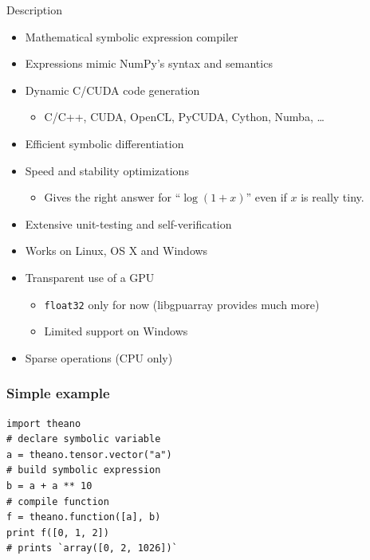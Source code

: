 \documentclass[utf8x,xcolor=pdftex,dvipsnames,table]{beamer}
\begin{document}
\begin{frame}{Description}
  \begin{itemize}
    \item Mathematical symbolic expression compiler
    \item Expressions mimic NumPy's syntax and semantics
    \item Dynamic C/CUDA code generation
    \begin{itemize}
      \item C/C++, CUDA, OpenCL, PyCUDA, Cython, Numba, \ldots
    \end{itemize}
    \item Efficient symbolic differentiation
    \item Speed and stability optimizations
    \begin{itemize}
      \item Gives the right answer for ``$\log (1 + x)$'' even if $x$ is really tiny.
    \end{itemize}
    \item Extensive unit-testing and self-verification
    \item Works on Linux, OS X and Windows
    \item Transparent use of a GPU
    \begin{itemize}
      \item {\tt float32} only for now (libgpuarray provides much more)
      \item Limited support on Windows
    \end{itemize}

    \item Sparse operations (CPU only)
  \end{itemize}
\end{frame}

\begin{frame}[fragile]
  \frametitle{Simple example}

\begin{lstlisting}
import theano
# declare symbolic variable
a = theano.tensor.vector("a")
# build symbolic expression
b = a + a ** 10
# compile function
f = theano.function([a], b)
print f([0, 1, 2])
# prints `array([0, 2, 1026])`
\end{lstlisting}
\end{frame}
\end{document}
